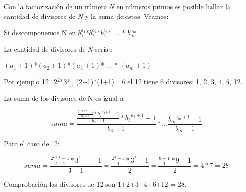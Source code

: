 Con la factorización de un número {\em N} en números primos es posible hallar la cantidad de divisores de {\em N} y la suma de estos. Veamos:

Si descomponemos N en $b_{1}^{a_{1}}$*$b_{2}^{a_{2}}$*$b_{3}^{a_{3}}$* ... * $b_{m}^{a_{m}}$

La cantidad de divisores de {\em N} sería :

$(a_{1}+1)$*$(a_{2}+1)$*$(a_{3}+1)$* ... * $(a_{m}+1)$

Por ejemplo 12=2$^{2}$*3$^{1}$ , (2+1)*(1+1)= 6 el 12 tiene 6 divisores: 1, 2, 3, 4, 6, 12.

La suma de los divisores de N es igual a:

$$ suma = \frac{ \frac{ \frac{{b_1}^{a_1+1}-1}{b_1 - 1}  *{b_2}^{a_2+1}-1}{b_2 - 1} *{b_3}^{a_3+1}-1}{b_3 - 1} * \dots \frac{{b_m}^{a_m+1} - 1}{b_m - 1} $$

Para el caso de 12:

$$ suma= \frac{\frac{2^{2+1}-1}{2-1}*3^{1+1}-1}{3-1} = \frac{\frac{2^3-1}{1}*3^2-1}{2} = \frac{\frac{8-1}{1}*9-1}{2}= 4*7 = 28 $$

Comprobación los divisores de 12 son 1+2+3+4+6+12 = 28.